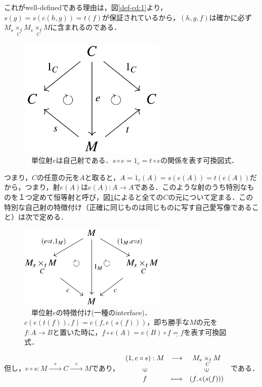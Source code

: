 \documentclass[uplatex, 12pt, a4paper, dvipdfmx]{jsarticle}
\begin{document}
これがwell-definedである理由は，図\ref{def-cd:1}より，$s(g)=s(c(h,g))=t(f)$が保証されているから，$(h,g,f)$は確かに必ず$M_s \underset{C}{\times_t}M_s \underset{C}{\times_t}M$に含まれるのである．\\[3cm]

\begin{figure}[ht] \begin{center}  \caption{\label{def-cd:3}　単位射$e$は自己射である．$s\circ e=1_c=t\circ e$の関係を表す可換図式．}
    \includegraphics[width=7cm]{cd-3.png}
\end{center}\end{figure}
つまり，$C$の任意の元を$A$と取ると，$A=1_c(A)=s(e(A))=t(e(A))$だから，つまり，射$e(A)$は$e(A):A\longrightarrow A$である．このような射のうち特別なものを１つ定めて恒等射と呼び，図\ref{def-cd:3}によると全ての$C$の元について定まる．この特別な自己射の特徴付け（正確に同じものは同じものに写す自己愛写像であること）は次で定める．

\begin{figure}[ht] \begin{center}  \caption{\label{def-cd:4}　単位射$e$の特徴付け(一種のinterface)．$c(e(t(f)),f)=c(f,e(s(f)))$，即ち勝手な$M$の元を$f:A\longrightarrow B$と置いた時に，$f\circ e(A)=e(B)\circ f\underline{=f}$を表す可換図式．}
    \includegraphics[width=7cm]{cd-4.png}
\end{center}\end{figure}
但し，$e\circ s:M\xrightarrow{\quad s\quad}C\xrightarrow{\quad e \quad}M$であり，
$\begin{array}{ccc}
    (1,e\circ s):M & \longrightarrow & M_s \underset{C}{\times_t}M\\
    \rotatebox{90}{$\in$} & & \rotatebox{90}{$\in$}\\
    f & \longmapsto & (f,e(s(f)))
\end{array}$
である．
\end{document}
